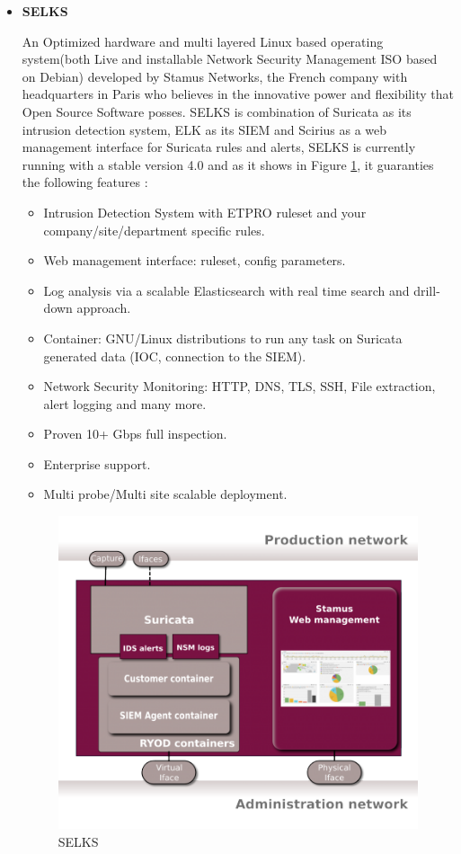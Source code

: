 \begin{itemize}[label=]
\item\textbf{SELKS}

An Optimized hardware and multi layered Linux based operating system(both Live and installable Network Security Management ISO based on Debian) developed by Stamus Networks, the French company with headquarters in Paris who  believes in the innovative power and flexibility that Open Source Software posses. 
SELKS is combination of Suricata as its intrusion detection system, ELK as its SIEM and Scirius as a web management interface for Suricata rules and alerts, SELKS is currently running with a stable version 4.0 and as it shows in Figure \ref{selks}, it guaranties the following features :
\begin{itemize}
    \item Intrusion Detection System with ETPRO ruleset and your company/site/department specific rules.
    \item Web management interface: ruleset, config parameters.
    \item Log analysis via a scalable Elasticsearch with real time search and drill-down approach.
    \item Container: GNU/Linux distributions to run any task on Suricata generated data (IOC, connection to the SIEM).
    \item Network Security Monitoring: HTTP, DNS, TLS, SSH, File extraction, alert logging and many more.
    \item Proven 10+ Gbps full inspection.
    \item Enterprise support.
    \item Multi probe/Multi site scalable deployment.
\end{itemize}

\begin{figure}[!htpb] 
\begin{center}
\includegraphics[height=3.6 in]{images/ATHENAselks.png}
\end{center}
\caption{ SELKS }
\label{selks}
\end{figure}


\end{itemize}
